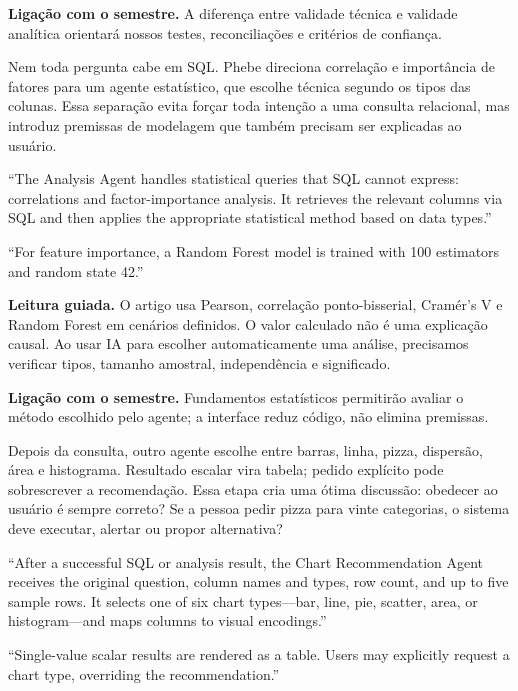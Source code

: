 \noindent\textbf{Ligação com o semestre.} A diferença entre validade técnica e validade analítica orientará nossos testes, reconciliações e critérios de confiança.

Nem toda pergunta cabe em SQL. Phebe direciona correlação e importância de fatores para um agente estatístico, que escolhe técnica segundo os tipos das colunas. Essa separação evita forçar toda intenção a uma consulta relacional, mas introduz premissas de modelagem que também precisam ser explicadas ao usuário.

\begin{ArticleBox}
``The Analysis Agent handles statistical queries that SQL cannot express: correlations and factor-importance analysis. It retrieves the relevant columns via SQL and then applies the appropriate statistical method based on data types.''

``For feature importance, a Random Forest model is trained with 100 estimators and random state 42.''
\end{ArticleBox}

\noindent\textbf{Leitura guiada.} O artigo usa Pearson, correlação ponto-bisserial, Cramér's V e Random Forest em cenários definidos. O valor calculado não é uma explicação causal. Ao usar IA para escolher automaticamente uma análise, precisamos verificar tipos, tamanho amostral, independência e significado.

\noindent\textbf{Ligação com o semestre.} Fundamentos estatísticos permitirão avaliar o método escolhido pelo agente; a interface reduz código, não elimina premissas.

Depois da consulta, outro agente escolhe entre barras, linha, pizza, dispersão, área e histograma. Resultado escalar vira tabela; pedido explícito pode sobrescrever a recomendação. Essa etapa cria uma ótima discussão: obedecer ao usuário é sempre correto? Se a pessoa pedir pizza para vinte categorias, o sistema deve executar, alertar ou propor alternativa?

\begin{ArticleBox}
``After a successful SQL or analysis result, the Chart Recommendation Agent receives the original question, column names and types, row count, and up to five sample rows. It selects one of six chart types---bar, line, pie, scatter, area, or histogram---and maps columns to visual encodings.''

``Single-value scalar results are rendered as a table. Users may explicitly request a chart type, overriding the recommendation.''
\end{ArticleBox}

